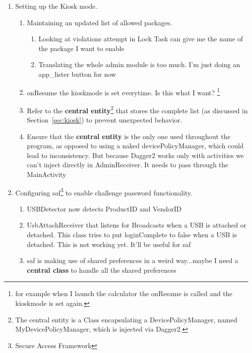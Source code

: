 \begin{enumerate}
    \item Setting up the Kiosk mode.
        \begin{enumerate}
            \item Maintaining an updated list of allowed packages.
                \begin{enumerate}
                    \item{Looking at violations attempt in Lock Task can give me the name of the package I want to enable}
                    \item{Translating the whole admin module is too much. I'm just doing an app\_lister button for now}
                \end{enumerate}
            \item onResume the kioskmode is set everytime. Is this what I want? \footnote{\label{onResume} for example when I launch the calculator the onResume is called and the kioskmode is set again.}
            \item Refer to the \textbf{central entity}\footnote{\label{central-entity} The central entity is a Class encapsulating a DevicePolicyManager, named MyDevicePolicyManager, which is injected via Dagger2.} that stores the complete list (as discussed in Section~\ref{sec:kiosk}) to prevent unexpected behavior.
            \item Ensure that the \textbf{central entity} is the only one used throughout the program, as opposed to using a naked devicePolicyManager, which could lead to inconsistency. But because Dagger2 works only with activities we can't inject directly in AdminReceiver. It needs to pass through the MainActivity
        \end{enumerate}
    \item Configuring \gls{saf}\footnote{\label{SAF} Secure Access Framework} to enable challenge password functionality.
          \begin{enumerate}
              \item USBDetector now detects ProductID and VendorID
              \item UsbAttachReceiver that listens for Broadcasts when a USB is attached or detached. This class tries to put loginComplete to false when a USB is detached. This is not working yet. It'll be useful for \gls{saf}
              \item \gls{saf} is making use of shared preferences in a weird way...maybe I need a \textbf{central class} to handle all the shared preferences

\end{enumerate}
\end{enumerate}
